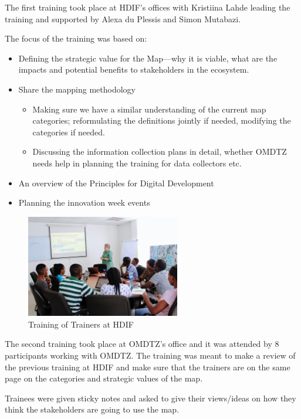 \documentclass[a4paper,12pt,twoside]{article}
\begin{document}
The first training took place at HDIF’s offices with Kristiina Lahde leading the training and supported by Alexa du Plessis and  Simon Mutabazi.
\medskip

The focus of the training was based on:

\begin{itemize}
    \item Defining the strategic value for the Map---why it is viable, what are the impacts and potential benefits to stakeholders in the ecosystem.
    \item Share the mapping methodology
    \begin{itemize}
        \item Making sure we have a similar understanding of the current map categories; reformulating the definitions jointly if needed, modifying the categories if needed.
        \item Discussing the information collection plans in detail, whether OMDTZ needs help in planning the training for data collectors etc.
    \end{itemize}
    \item An overview of the Principles for Digital Development
    \item Planning the innovation week events
\end{itemize}

\begin{figure}[h]
  \caption{Training of Trainers at HDIF}
  \centering
  \includegraphics[width=0.6\textwidth]{images/HDIF_training.jpg}
\end{figure}

The second training took place at OMDTZ’s office and it was attended by 8 participants working with OMDTZ. The training was meant to make a review of the previous training at HDIF and make sure that the trainers are on the same page on the categories and strategic values of the map.
\medskip

Trainees were given sticky notes and asked to give their views/ideas on how they think the stakeholders are going to use the map.
\end{document}
